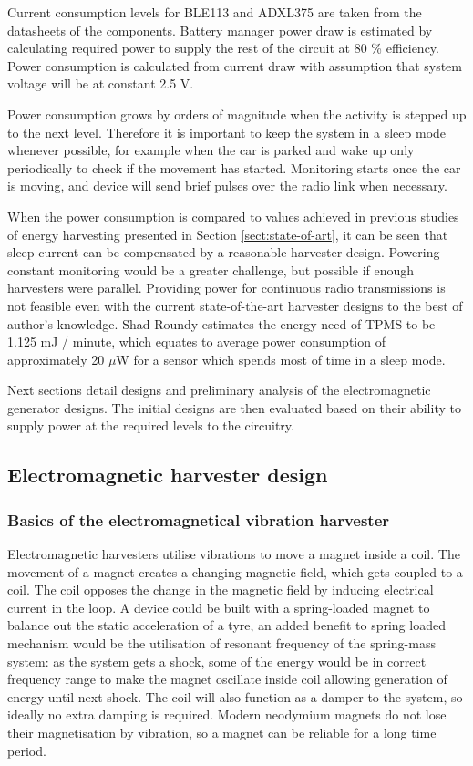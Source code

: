 Current consumption levels for BLE113 and ADXL375 are taken from the datasheets of the components. Battery manager power draw is estimated by calculating required power to supply the rest of the circuit at 80 \% efficiency. Power consumption is calculated from current draw with assumption that system voltage will be at constant 2.5 V.

Power consumption grows by orders of magnitude when the activity is stepped up to the next level. Therefore it is important to keep the system in a sleep mode whenever possible, for example when the car is parked and wake up only periodically to check if the movement has started. Monitoring starts once the car is moving, and device will send brief pulses over the radio link when necessary.

When the power consumption is compared to values achieved in previous studies of energy harvesting presented in Section \ref{sect:state-of-art}, it can be seen that sleep current can be compensated by a reasonable harvester design. Powering constant monitoring would be a greater challenge, but possible if enough harvesters were parallel. Providing power for continuous radio transmissions is not feasible even with the current state-of-the-art harvester designs to the best of author's knowledge. Shad Roundy \cite{Roundy2008} estimates the energy need of TPMS to be 1.125 mJ / minute, which equates to average power consumption of approximately 20 $\mu$W for a sensor which spends most of time in a sleep mode.

Next sections detail designs and preliminary analysis of the electromagnetic generator designs. The initial designs are then evaluated based on their ability to supply power at the required levels to the circuitry.

\subsection{Electromagnetic harvester design}\label{sect:emh_design}
\subsubsection{Basics of the electromagnetical vibration harvester}
Electromagnetic harvesters utilise vibrations to move a magnet inside a coil. The movement of a magnet creates a changing magnetic field, which gets coupled to a coil. The coil opposes the change in the magnetic field by inducing electrical current in the loop. A device could be built with a spring-loaded magnet to balance out the static acceleration of a tyre, an added benefit to spring loaded mechanism would be the utilisation of resonant frequency of the spring-mass system: as the system gets a shock, some of the energy would be in correct frequency range to make the magnet oscillate inside coil allowing generation of energy until next shock. The coil will also function as a damper to the system, so ideally no extra damping is required. Modern neodymium magnets do not lose their magnetisation by vibration, so a magnet can be reliable for a long time period. 

